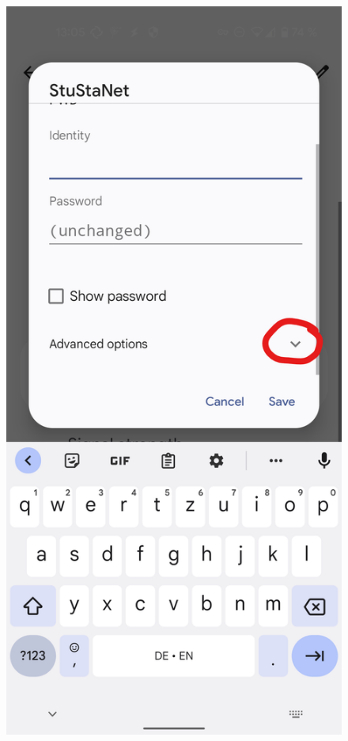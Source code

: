 \documentclass[a4paper,12pt]{scrartcl}
\begin{document}
\begin{figure}[h]
\begin{minipage}{0.20\textwidth}
		\includegraphics[width=0.7\linewidth,keepaspectratio]{Bilder/Android/android12_3}
	\end{minipage}
	\begin{minipage}{0.20\textwidth}

\end{minipage}
\end{figure}
\end{document}
